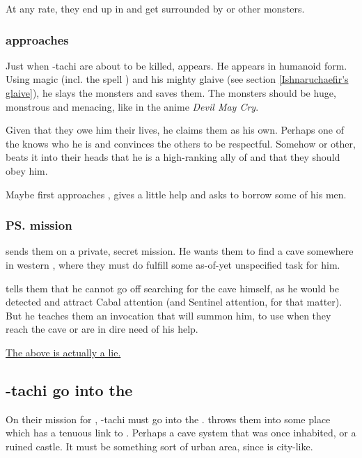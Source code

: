 \begin{garbage}
At any rate, they end up in \Nyx{} and get surrounded by \banes{} or other monsters. 






\subsubsection{\Ishnaruchaefir{} approaches}
Just when \Shilred-tachi are about to be killed, \Ishnaruchaefir{} appears. He appears in humanoid form. Using magic (incl. the spell ) and his mighty glaive (see section \ref{Ishnaruchaefir's glaive}), he slays the monsters and saves them. The monsters should be huge, monstrous and menacing, like in the anime \emph{Devil May Cry}. 

Given that they owe him their lives, he claims them as his own. Perhaps one of the \RNinjas{} knows who he is and convinces the others to be respectful. Somehow or other, \Ishnaruchaefir{} beats it into their heads that he is a high-ranking ally of \Hriist{} and that they should obey him. 

Maybe \Ishnaruchaefir{} first approaches \Narkiza{}, gives a little help and asks to borrow some of his men. 






\subsubsection{\ps{\Ishnaruchaefir} mission}
\Ishnaruchaefir{} sends them on a private, secret mission. He wants them to find a cave somewhere in western \Velcad{}, where they must do fulfill some as-of-yet unspecified task for him. 

\Ishnaruchaefir{} tells them that he cannot go off searching for the cave himself, as he would be detected and attract Cabal attention (and Sentinel attention, for that matter). But he teaches them an invocation that will summon him, to use when they reach the cave or are in dire need of his help. 

\hyperref[Ishnaruchaefir's fake mission]{The above is actually a lie.}







\subsection{\Shilred-tachi go into the \Wylde}
On their mission for \Ishna, \Shilred-tachi must go into the \Wylde{}. \Ishnaruchaefir{} throws them into some place which has a tenuous link to \Nyx. Perhaps a cave system that was once inhabited, or a ruined castle. It must be something sort of urban area, since \Nyx{} is city-like. 


\end{garbage}
